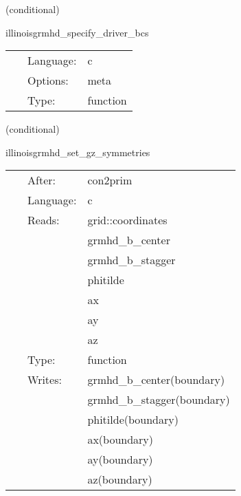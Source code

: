 \documentclass{article}
\begin{document}
   (conditional) 

\hspace{5mm} illinoisgrmhd\_specify\_driver\_bcs 

\hspace{5mm}{\it register boundary conditions with presync } 


\hspace{5mm}

 \begin{tabular*}{160mm}{cll} 
~ & Language:  & c \\ 
~ & Options:  & meta \\ 
~ & Type:  & function \\ 
\end{tabular*} 


\vspace{5mm}

   (conditional) 

\hspace{5mm} illinoisgrmhd\_set\_gz\_symmetries 

\hspace{5mm}{\it compute post-initialdata quantities } 


\hspace{5mm}

 \begin{tabular*}{160mm}{cll} 
~ & After:  & con2prim \\ 
~ & Language:  & c \\ 
~ & Reads:  & grid::coordinates \\ 
~& ~ &grmhd\_b\_center\\ 
~& ~ &grmhd\_b\_stagger\\ 
~& ~ &phitilde\\ 
~& ~ &ax\\ 
~& ~ &ay\\ 
~& ~ &az\\ 
~ & Type:  & function \\ 
~ & Writes:  & grmhd\_b\_center(boundary) \\ 
~& ~ &grmhd\_b\_stagger(boundary)\\ 
~& ~ &phitilde(boundary)\\ 
~& ~ &ax(boundary)\\ 
~& ~ &ay(boundary)\\ 
~& ~ &az(boundary)\\ 
\end{tabular*} 


\vspace{5mm}
\end{document}
